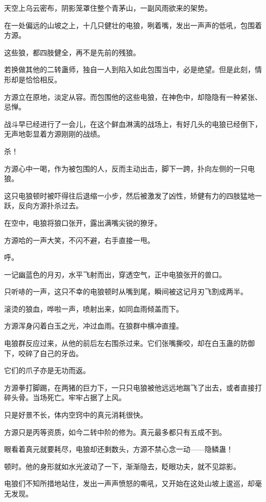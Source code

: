 
\begin{this_body}

天空上乌云密布，阴影笼罩住整个青茅山，一副风雨欲来的架势。

在一处偏远的山坡之上，十几只健壮的电狼，咧着嘴，发出一声声的低吼，包围着方源。

这些狼，都四肢健全，再不是先前的残狼。

若换做其他的二转蛊师，独自一人到陷入如此包围当中，必是绝望。但是此刻，情形却是恰恰相反。

方源立在原地，淡定从容。而包围他的这些电狼，在神色中，却隐隐有一种紧张、忌惮。

战斗早已经进行了一会儿，在这个鲜血淋漓的战场上，有好几头的电狼已经倒下，无声地彰显着方源刚刚的战绩。

杀！

方源心中一喝，作为被包围的人，反而主动出击，脚下一跨，扑向左侧的一只电狼。

这只电狼顿时被吓得往后退缩一小步，然后被激发了凶性，矫健有力的四肢猛地一跃，反向方源扑杀过去。

在空中，电狼将狼口张开，露出满嘴尖锐的獠牙。

方源哈的一声大笑，不闪不避，右手直接一甩。

呼。

一记幽蓝色的月刃，水平飞射而出，穿透空气，正中电狼张开的兽口。

只听哧的一声，这只不幸的电狼顿时从嘴到尾，瞬间被这记月刃飞割成两半。

滚烫的狼血，哗啦一声，喷射出来，如同血雨倾盖而下。

方源浑身闪着白玉之光，冲过血雨。在狼群中横冲直撞。

电狼群反应过来，从他的前后左右围杀过来。它们张嘴撕咬，却在白玉蛊的防御下，咬碎了自己的牙齿。

它们的爪子亦是无功而返。

方源拳打脚踢，在两猪的巨力下，一只只电狼被他远远地踹飞了出去，或者直接打碎头骨。当场死亡。牢牢占据了上风。

只是好景不长，体内空窍中的真元消耗很快。

方源只是丙等资质，如今二转中阶的修为。真元最多都只有五成不到。

眼看着真元就要耗尽，电狼却还剩数头，方源不禁心念一动——隐鳞蛊！

顿时。他的身形就如水光波动了一下，渐渐隐去，眨眼功夫，就不见踪影。

电狼们不知所措地站住，发出一声声愤怒的嘶吼，又开始在这处山坡上逡巡，却毫无发现。


\end{this_body}
